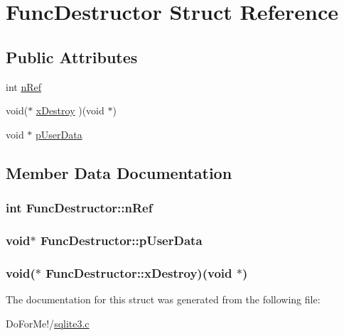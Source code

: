 \hypertarget{struct_func_destructor}{\section{Func\-Destructor Struct Reference}
\label{struct_func_destructor}
}
\subsection*{Public Attributes}
\begin{DoxyCompactItemize}
\item 
int \hyperlink{struct_func_destructor_a8b1bf3af00c88400efc1dd74a4410463}{n\-Ref}
\item 
void($\ast$ \hyperlink{struct_func_destructor_a8d688d51ad881306c81b3f8d4795e076}{x\-Destroy} )(void $\ast$)
\item 
void $\ast$ \hyperlink{struct_func_destructor_a181875609f0f8221985cd6cfd7ad8cd8}{p\-User\-Data}
\end{DoxyCompactItemize}


\subsection{Member Data Documentation}
\hypertarget{struct_func_destructor_a8b1bf3af00c88400efc1dd74a4410463}{
\subsubsection[{n\-Ref}]{\setlength{\rightskip}{0pt plus 5cm}int Func\-Destructor\-::n\-Ref}}\label{struct_func_destructor_a8b1bf3af00c88400efc1dd74a4410463}
\hypertarget{struct_func_destructor_a181875609f0f8221985cd6cfd7ad8cd8}{
\subsubsection[{p\-User\-Data}]{\setlength{\rightskip}{0pt plus 5cm}void$\ast$ Func\-Destructor\-::p\-User\-Data}}\label{struct_func_destructor_a181875609f0f8221985cd6cfd7ad8cd8}
\hypertarget{struct_func_destructor_a8d688d51ad881306c81b3f8d4795e076}{
\subsubsection[{x\-Destroy}]{\setlength{\rightskip}{0pt plus 5cm}void($\ast$ Func\-Destructor\-::x\-Destroy)(void $\ast$)}}\label{struct_func_destructor_a8d688d51ad881306c81b3f8d4795e076}


The documentation for this struct was generated from the following file\-:\begin{DoxyCompactItemize}
\item 
Do\-For\-Me!/\hyperlink{sqlite3_8c}{sqlite3.\-c}\end{DoxyCompactItemize}
